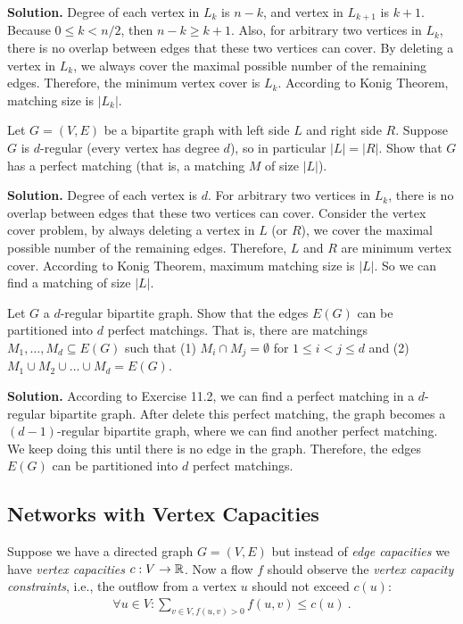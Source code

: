 \documentclass[12pt,a4]{article}
\begin{document}
\textbf{Solution.} Degree of each vertex in $L_k$ is $n-k$, and vertex in $L_{k+1}$ is $k+1$. Because $0 \leq k < n/2$, then $n-k\geq k+1$. Also, for arbitrary  two vertices in $L_k$, there is no overlap between edges that these two vertices can cover. By deleting a vertex in $L_{k}$, we always cover the maximal possible number of the remaining edges. Therefore, the minimum vertex cover is $L_k$. According to Konig Theorem, matching size is $|L_k|$.

\begin{exercise}
 Let $G = (V,E)$ be a bipartite graph with left side $L$ and right side $R$.
 Suppose $G$ is $d$-regular (every vertex has degree $d$), so in particular $|L| = |R|$.
 Show that $G$ 
 has a perfect matching (that is, a matching $M$ of size $|L|$).
\end{exercise}

\textbf{Solution.} Degree of each vertex is $d$.  For arbitrary  two vertices in $L_k$, there is no overlap between edges that these two vertices can cover. Consider the vertex cover problem, by always deleting a vertex in $L$ (or $R$), we cover the maximal possible number of the remaining edges. Therefore, $L$ and $R$ are minimum vertex cover. According to Konig Theorem, maximum matching size is $|L|$. So we can find a matching of size $|L|$.


\begin{exercise}
  Let $G$ a $d$-regular bipartite graph. Show that the edges $E(G)$ can be partitioned
  into $d$ perfect matchings. That is, there are matchings $M_1, \dots, M_d \subseteq E(G)$ such that
  (1) $M_i \cap M_j = \emptyset$ for $1 \leq i < j \leq d$ and 
  (2) $M_1 \cup M_2 \cup \dots \cup M_d = E(G)$.
\end{exercise}

\textbf{Solution.} According to Exercise 11.2, we can find a perfect matching in a $d$-regular bipartite graph. After delete this perfect matching, the graph becomes a $(d-1)$-regular bipartite graph, where we can find another perfect matching. We keep doing this until there is no edge in the graph. Therefore, the edges $E(G)$ can be partitioned into $d$ perfect matchings.

\subsection{Networks with Vertex Capacities}

Suppose we have a directed graph $G = (V,E)$ but instead of 
{\em edge capacities} we have {\em vertex capacities} $c: V \rightarrow \mathbb{R}$.
Now a flow $f$ should observe the {\em vertex capacity constraints}, i.e.,
the outflow from a vertex $u$ should not exceed $c(u)$:
\begin{align*}
  \forall u \in V: \sum_{v \in V, f(u,v) > 0} f(u,v) \leq c(u) \ .
\end{align*}
\end{document}
